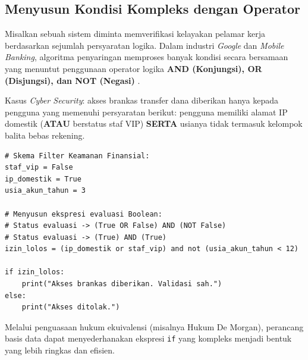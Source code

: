 \subsection{Menyusun Kondisi Kompleks dengan Operator}

Misalkan sebuah sistem diminta memverifikasi kelayakan pelamar kerja berdasarkan sejumlah persyaratan logika. Dalam industri \textit{Google} dan \textit{Mobile Banking}, algoritma penyaringan memproses banyak kondisi secara bersamaan yang menuntut penggunaan operator logika \textbf{AND (Konjungsi), OR (Disjungsi), dan NOT (Negasi)} \cite{python_docs_boolean}.

\begin{contoh}
Kasus \textit{Cyber Security}: akses brankas transfer dana diberikan hanya kepada pengguna yang memenuhi persyaratan berikut: pengguna memiliki alamat IP domestik (\textbf{ATAU} berstatus staf VIP) \textbf{SERTA} usianya tidak termasuk kelompok balita bebas rekening.

\begin{lstlisting}[style=pythonstyle, caption={Operasi Filter Keamanan dengan Operator Boolean}]
# Skema Filter Keamanan Finansial:
staf_vip = False
ip_domestik = True
usia_akun_tahun = 3

# Menyusun ekspresi evaluasi Boolean:
# Status evaluasi -> (True OR False) AND (NOT False)
# Status evaluasi -> (True) AND (True)
izin_lolos = (ip_domestik or staf_vip) and not (usia_akun_tahun < 12)

if izin_lolos:
    print("Akses brankas diberikan. Validasi sah.")
else:
    print("Akses ditolak.")
\end{lstlisting}
Melalui penguasaan hukum ekuivalensi (misalnya Hukum De Morgan), perancang basis data dapat menyederhanakan ekspresi \texttt{if} yang kompleks menjadi bentuk yang lebih ringkas dan efisien.
\end{contoh}
